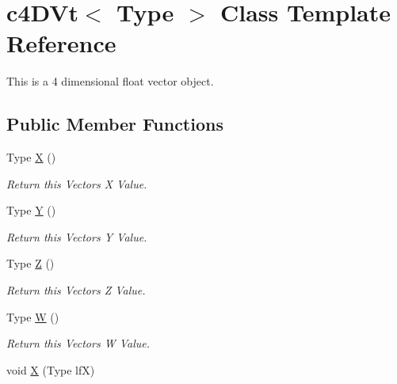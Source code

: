 \hypertarget{classc4_d_vt}{
\section{c4DVt$<$ Type $>$ Class Template Reference}
\label{classc4_d_vt}
}


This is a 4 dimensional float vector object.  


\subsection*{Public Member Functions}
\begin{DoxyCompactItemize}
\item 
\hypertarget{classc4_d_vt_a006c55d4663fb7657a2a2ff844359860}{
Type \hyperlink{classc4_d_vt_a006c55d4663fb7657a2a2ff844359860}{X} ()}
\label{classc4_d_vt_a006c55d4663fb7657a2a2ff844359860}

\begin{DoxyCompactList}\small\item\em Return this Vectors X Value. \end{DoxyCompactList}\item 
\hypertarget{classc4_d_vt_a1424fad2c0b4b92e24d2f634511a6e18}{
Type \hyperlink{classc4_d_vt_a1424fad2c0b4b92e24d2f634511a6e18}{Y} ()}
\label{classc4_d_vt_a1424fad2c0b4b92e24d2f634511a6e18}

\begin{DoxyCompactList}\small\item\em Return this Vectors Y Value. \end{DoxyCompactList}\item 
\hypertarget{classc4_d_vt_a41120a902ab6a0fec4c71ec90d1dd6cd}{
Type \hyperlink{classc4_d_vt_a41120a902ab6a0fec4c71ec90d1dd6cd}{Z} ()}
\label{classc4_d_vt_a41120a902ab6a0fec4c71ec90d1dd6cd}

\begin{DoxyCompactList}\small\item\em Return this Vectors Z Value. \end{DoxyCompactList}\item 
\hypertarget{classc4_d_vt_a4c6b8608cb192c36076cb257deee173b}{
Type \hyperlink{classc4_d_vt_a4c6b8608cb192c36076cb257deee173b}{W} ()}
\label{classc4_d_vt_a4c6b8608cb192c36076cb257deee173b}

\begin{DoxyCompactList}\small\item\em Return this Vectors W Value. \end{DoxyCompactList}\item 
\hypertarget{classc4_d_vt_ab4bd3319bd50949ad0b98bafcffe6e0f}{
void \hyperlink{classc4_d_vt_ab4bd3319bd50949ad0b98bafcffe6e0f}{X} (Type lfX)}
\label{classc4_d_vt_ab4bd3319bd50949ad0b98bafcffe6e0f}


\end{DoxyCompactItemize}
